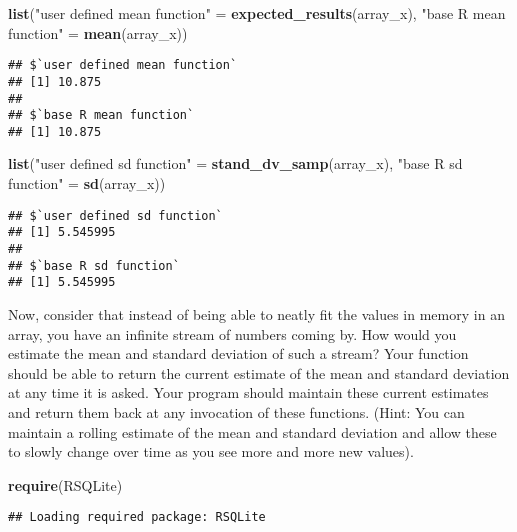 \documentclass[]{article}
\newenvironment{Shaded}{\begin{snugshade}}{\end{snugshade}}
\newcommand{\KeywordTok}[1]{\textcolor[rgb]{0.13,0.29,0.53}{\textbf{{#1}}}}
\newcommand{\StringTok}[1]{\textcolor[rgb]{0.31,0.60,0.02}{{#1}}}
\newcommand{\NormalTok}[1]{{#1}}
\begin{document}
\newpage 

\begin{Shaded}
\begin{Highlighting}[]
\KeywordTok{list}\NormalTok{(}\StringTok{"user defined mean function"} \NormalTok{=}\StringTok{ }\KeywordTok{expected_results}\NormalTok{(array_x),}
     \StringTok{"base R mean function"} \NormalTok{=}\StringTok{ }\KeywordTok{mean}\NormalTok{(array_x))}
\end{Highlighting}
\end{Shaded}

\begin{verbatim}
## $`user defined mean function`
## [1] 10.875
## 
## $`base R mean function`
## [1] 10.875
\end{verbatim}

\begin{Shaded}
\begin{Highlighting}[]
\KeywordTok{list}\NormalTok{(}\StringTok{"user defined sd function"} \NormalTok{=}\StringTok{ }\KeywordTok{stand_dv_samp}\NormalTok{(array_x), }
     \StringTok{"base R sd function"} \NormalTok{=}\StringTok{ }\KeywordTok{sd}\NormalTok{(array_x))}
\end{Highlighting}
\end{Shaded}

\begin{verbatim}
## $`user defined sd function`
## [1] 5.545995
## 
## $`base R sd function`
## [1] 5.545995
\end{verbatim}

Now, consider that instead of being able to neatly fit the values in
memory in an array, you have an infinite stream of numbers coming by.
How would you estimate the mean and standard deviation of such a stream?
Your function should be able to return the current estimate of the mean
and standard deviation at any time it is asked. Your program should
maintain these current estimates and return them back at any invocation
of these functions. (Hint: You can maintain a rolling estimate of the
mean and standard deviation and allow these to slowly change over time
as you see more and more new values).

\begin{Shaded}
\begin{Highlighting}[]
\KeywordTok{require}\NormalTok{(RSQLite)}
\end{Highlighting}
\end{Shaded}

\begin{verbatim}
## Loading required package: RSQLite
\end{verbatim}
\end{document}

